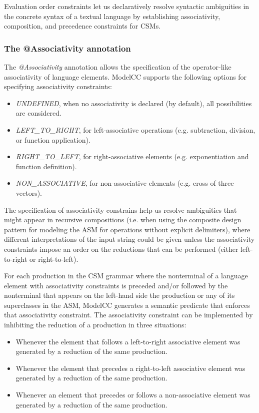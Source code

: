 \documentclass[a4paper,twoside,onecolumn]{article}
\newcommand{\an}[1]{\emph{#1}} %
\begin{document}
Evaluation order constraints let us declaratively resolve syntactic ambiguities in the concrete syntax of a textual language by establishing associativity, composition, and precedence constraints for CSMs.

\subsubsection{The @Associativity annotation}

The \an{@Associativity} annotation allows the specification of the operator-like associativity of language elements.
ModelCC supports the following options for specifying associativity constraints:

\begin{itemize}
\item \an{UNDEFINED}, when no associativity is declared (by default), all possibilities are considered.
\item \an{LEFT\_TO\_RIGHT}, for left-associative operations (e.g. subtraction, division, or function application).
\item \an{RIGHT\_TO\_LEFT}, for right-associative elements (e.g. exponentiation and function definition).
\item \an{NON\_ASSOCIATIVE}, for non-associative elements (e.g. cross of three vectors).
\end{itemize}

The specification of associativity constrains help us resolve ambiguities that might appear in recursive compositions (i.e. when using the composite design pattern for modeling the ASM for operations without explicit delimiters), where different interpretations of the input string could be given unless the associativity constraints impose an order on the reductions that can be performed (either left-to-right or right-to-left).

For each production in the CSM grammar where the nonterminal of a language element with associativity constraints is preceded and/or followed by the nonterminal that appears on the left-hand side the production or any of its superclasses in the ASM, ModelCC generates a semantic predicate that enforces that associativity constraint.
The associativity constraint can be implemented by inhibiting the reduction of a production in three situations:

\begin{itemize}
\item Whenever the element that follows a left-to-right associative element was generated by a reduction of the same production.
\item Whenever the element that precedes a right-to-left associative element was generated by a reduction of the same production.
\item Whenever an element that precedes or follows a non-associative element was generated by a reduction of the same production.
\end{itemize}
\end{document}
